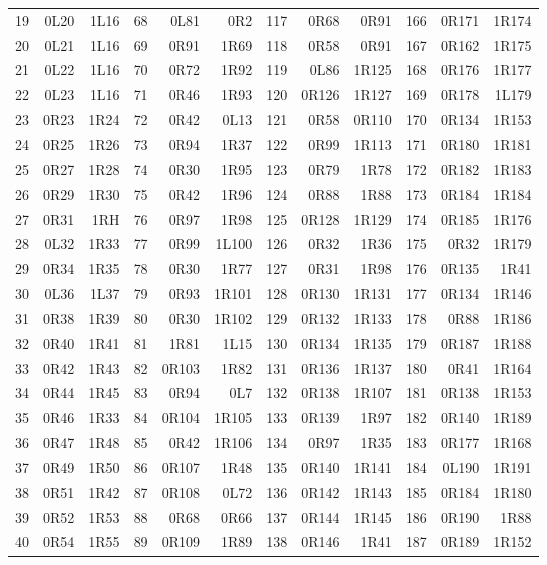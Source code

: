 \begin{center}
\begin{tabular}{rrr@{\hspace{7mm}}rrr@{\hspace{7mm}}rrr@{\hspace{7mm}}rrr}
19 & 0L20 & 1L16 & 68 & 0L81 & 0R2 & 117 & 0R68 & 0R91 & 166 & 0R171 & 1R174 \\
20 & 0L21 & 1L16 & 69 & 0R91 & 1R69 & 118 & 0R58 & 0R91 & 167 & 0R162 & 1R175 \\
21 & 0L22 & 1L16 & 70 & 0R72 & 1R92 & 119 & 0L86 & 1R125 & 168 & 0R176 & 1R177 \\
22 & 0L23 & 1L16 & 71 & 0R46 & 1R93 & 120 & 0R126 & 1R127 & 169 & 0R178 & 1L179 \\
23 & 0R23 & 1R24 & 72 & 0R42 & 0L13 & 121 & 0R58 & 0R110 & 170 & 0R134 & 1R153 \\
24 & 0R25 & 1R26 & 73 & 0R94 & 1R37 & 122 & 0R99 & 1R113 & 171 & 0R180 & 1R181 \\
25 & 0R27 & 1R28 & 74 & 0R30 & 1R95 & 123 & 0R79 & 1R78 & 172 & 0R182 & 1R183 \\
26 & 0R29 & 1R30 & 75 & 0R42 & 1R96 & 124 & 0R88 & 1R88 & 173 & 0R184 & 1R184 \\
27 & 0R31 & 1RH & 76 & 0R97 & 1R98 & 125 & 0R128 & 1R129 & 174 & 0R185 & 1R176 \\
28 & 0L32 & 1R33 & 77 & 0R99 & 1L100 & 126 & 0R32 & 1R36 & 175 & 0R32 & 1R179 \\
29 & 0R34 & 1R35 & 78 & 0R30 & 1R77 & 127 & 0R31 & 1R98 & 176 & 0R135 & 1R41 \\
30 & 0L36 & 1L37 & 79 & 0R93 & 1R101 & 128 & 0R130 & 1R131 & 177 & 0R134 & 1R146 \\
31 & 0R38 & 1R39 & 80 & 0R30 & 1R102 & 129 & 0R132 & 1R133 & 178 & 0R88 & 1R186 \\
32 & 0R40 & 1R41 & 81 & 1R81 & 1L15 & 130 & 0R134 & 1R135 & 179 & 0R187 & 1R188 \\
33 & 0R42 & 1R43 & 82 & 0R103 & 1R82 & 131 & 0R136 & 1R137 & 180 & 0R41 & 1R164 \\
34 & 0R44 & 1R45 & 83 & 0R94 & 0L7 & 132 & 0R138 & 1R107 & 181 & 0R138 & 1R153 \\
35 & 0R46 & 1R33 & 84 & 0R104 & 1R105 & 133 & 0R139 & 1R97 & 182 & 0R140 & 1R189 \\
36 & 0R47 & 1R48 & 85 & 0R42 & 1R106 & 134 & 0R97 & 1R35 & 183 & 0R177 & 1R168 \\
37 & 0R49 & 1R50 & 86 & 0R107 & 1R48 & 135 & 0R140 & 1R141 & 184 & 0L190 & 1R191 \\
38 & 0R51 & 1R42 & 87 & 0R108 & 0L72 & 136 & 0R142 & 1R143 & 185 & 0R184 & 1R180 \\
39 & 0R52 & 1R53 & 88 & 0R68 & 0R66 & 137 & 0R144 & 1R145 & 186 & 0R190 & 1R88 \\
40 & 0R54 & 1R55 & 89 & 0R109 & 1R89 & 138 & 0R146 & 1R41 & 187 & 0R189 & 1R152 \\

\end{tabular}
\end{center}
